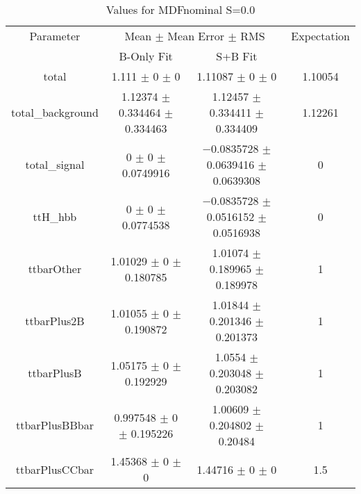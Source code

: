\begin{table}
\centering
\caption{Values for MDFnominal S=0.0}
\begin{tabular}{cccc}
\toprule
Parameter & \multicolumn{2}{c}{Mean $\pm$ Mean Error $\pm$ RMS} & Expectation\\
 & B-Only Fit & S+B Fit & \\
\midrule
total & \num{1.111} $\pm$ \num{0} $\pm$ \num{0} & \num{1.11087} $\pm$ \num{0} $\pm$ \num{0} & \num{1.10054}\\
total\_background & \num{1.12374} $\pm$ \num{0.334464} $\pm$ \num{0.334463} & \num{1.12457} $\pm$ \num{0.334411} $\pm$ \num{0.334409} & \num{1.12261}\\
total\_signal & \num{0} $\pm$ \num{0} $\pm$ \num{0.0749916} & \num{-0.0835728} $\pm$ \num{0.0639416} $\pm$ \num{0.0639308} & \num{0}\\
ttH\_hbb & \num{0} $\pm$ \num{0} $\pm$ \num{0.0774538} & \num{-0.0835728} $\pm$ \num{0.0516152} $\pm$ \num{0.0516938} & \num{0}\\
ttbarOther & \num{1.01029} $\pm$ \num{0} $\pm$ \num{0.180785} & \num{1.01074} $\pm$ \num{0.189965} $\pm$ \num{0.189978} & \num{1}\\
ttbarPlus2B & \num{1.01055} $\pm$ \num{0} $\pm$ \num{0.190872} & \num{1.01844} $\pm$ \num{0.201346} $\pm$ \num{0.201373} & \num{1}\\
ttbarPlusB & \num{1.05175} $\pm$ \num{0} $\pm$ \num{0.192929} & \num{1.0554} $\pm$ \num{0.203048} $\pm$ \num{0.203082} & \num{1}\\
ttbarPlusBBbar & \num{0.997548} $\pm$ \num{0} $\pm$ \num{0.195226} & \num{1.00609} $\pm$ \num{0.204802} $\pm$ \num{0.20484} & \num{1}\\
ttbarPlusCCbar & \num{1.45368} $\pm$ \num{0} $\pm$ \num{0} & \num{1.44716} $\pm$ \num{0} $\pm$ \num{0} & \num{1.5}\\
\bottomrule
\end{tabular}
\end{table}